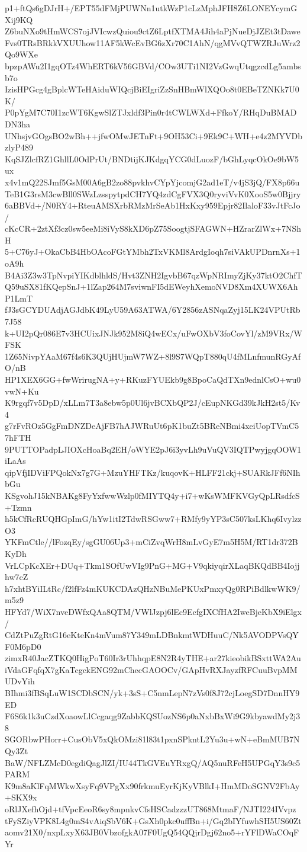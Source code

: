 p1+ftQs6gDJrH+/EPT55dFMjPUWNn1utkWzP1cLzMphJFH8Z6LONEYcymGXij9KQ
Z6buNXo9tHmWCS7ojJVIcwzQuiou9ctZ6LptfXTMA4Jih4aPjNueDjJZEt3tDawe
Fvs0TRsBRkkVXUUhow11AF5kWcEvBG6zXr70C1AhN/qgMVvQTWZRJuWrz2Qo9WXe
bpzpAWu2I1gqOTz4WhERT6kV56GBVd/COw3UTi1NI2VzGwqUtqgzcdLg5ambsb7o
IzisHPGcg4gBplcWTeHAiduWIQcjBiEIgriZzSnHBmWlXQOo8t0EBeTZNKk7U0K/
P0pYgM7C70I1zcWT6KgwSlZTJxldf3Pin0r4tCWLWXd+FfkoY/RHqDuBMADDN3ha
UNhsjvGOgsBO2wBh++jfwOMwJETnFt+9OH53Ci+9Ek9C+WH+e4z2MYVDbzlyP489
KqSJZlcfRZ1GhllL0OdPrUt/BNDtijKJKdgqYCG0dLuozF/bGhLyqcOkOe9bW5ux
x4v1mQ22SJmf5GsM00A6gB2zo88pvkhvCYpYjcomjG2ad1eT/v4jS3jQ/FX8p66u
TeB1G3rsM3cwBll0SWzLzsspytpdCH7YQ4zdCgFVX3Q0ryviVvK0XooS5w0Bjjry
6aBBVd+/N0RY4+RteuAMSXrbRMzMrSeAb1HxKxy959Epjr82IlaloF33vJtFcJo/
cKcCR+2ztXf3cz0sw5eeMi8iVyS8kXD6pZ75SoogtjSFAGWN+HZrarZlWx+7NShH
5+C76yJ+OkaCbB4HbOAcoFGtYMbh2TxVKMl8ArdgIoqh7siVAkUPDnrnXs+1oA9h
B4Ai3Z3w3TpNvpiYIKdblhldS/Hvt3ZNH2IgvbB67qzWpNRImyZjKy37ktO2ChfT
Q59uSX81fKQepSnJ+1lZap264M7sviwnFI5dEWeyhXemoNVD8Xm4XUWX6AhP1LmT
fJ3sGCYDUAdjAGJdbK49LyU59A63ATWA/6Y2856zASNqaZyj15LK24VPUtRb7J58
k+UI2pQr086E7v3HCUixJNJk952M8iQ4wECx/uFwOXbV3foCovYl/zM9VRx/WFSK
1Z65NivpYAaM67f4s6K3QUjHUjmW7WZ+8l9S7WQpT880qU4fMLnfmunRGyAfO/nB
HP1XEX6GG+fwWrirugNA+y+RKuzFYUEkb9g8BpoCaQdTXn9ednlCsO+wu0vwN+Ku
K9rgqf7v5DpD/xLLm7T3a8ebw5p0Ul6jvBCXbQP2J/cEupNKGd39kJkH2st5/Kv4
g7rFvROz5GgFmDNZDeAjFB7hAJWRuUt6pK1buZt5BReNBmi4xeiUopTVmC57hFTH
9PUTTOPadpLJIOXcHoaBq2EH/oWYE2pJ6i3yvLh9uVuQV3IQTPwyjgqOOW1iLaAs
qipVfjIDViFPQokNx7g7G+MzuYHFTKz/kuqovK+HLFF21ckj+SUARkJFf6NIhbGu
KSgvohJ15kNBAKg8FyYxfwwWzlp0fMIYTQ4y+i7+wKsWMFKVGyQpLRsdfcS+Tzmn
h5kCfRcRUQHGpImG/hYw1itI2TdwRSGww7+RMfy9yYP3sC507ksLKhq6IvylzzO3
YKFmCtle//lFozqEy/sgGU06Up3+mCiZvqWrH8mLvGyE7m5H5M/RT1dr372BKyDh
VrLCpKcXEr+DUq+Tkm1SOfUwVIg9PnG+MG+V9qkiyqirXLaqBKQdBB4Iojjhw7cZ
h7xhtBYiILtRc/f2lfFz4mKUKCDAzQHzNBuMePKUxPmxyQg0RPiBdlkwWK9/m5z9
HFYd7/WiX7nveDWfxQAa8QTM/VWlJzpj6lEc9EcfgIXCfHA2IweBjeKbX9iElgx/
CdZtPuZgRtG16eKteKn4mVum87Y349mLDBnkmtWDHuuC/Nk5AVODPVsQYF0M6pD0
zimxR40JacZTKQ0HigPoT60Ir3rUhhqpE8N2R4yTHE+ar27kieobikBSxttWA2Au
iVdaGFqfqX7gKaTcgckENG92mChecGAOOCv/GApHvRXJayzfRFCuuBvpMMUDvYih
BIhmi3fBSqLuW1SCDbSCN/yk+3sS+C5nmLepN7zVs0f8J72cjLoegSD7DnnHY9ED
F6S6k1k3uCzdXoaowLlCcgaqg9ZabbKQSUozNS6p0aNxbBxWi9G9kbyawdMy2j38
SGORbwPHorr+CusObV5xQkOMzi81l83t1pxnSPkntL2Yu3u+wN+eBmMUB7NQy3Zt
BaW/NFLZMcD0egdiQagJlZI/IU44TkGVEuYRxgQ/AQ5nuRFeH5UPGqY3s9c5PARM
K9m8aKlFqMWkwXsyFq9VPgXx90frkmuEyrKjKyVBlkI+HmMDoSGNV2FbAy+SKX9x
oRlJXefhOjd+tfVpcEeoR6sy8mpnkvCfsHSCadzzzUT868MtmaF/NJTI224IVvpz
tFySZiyVPK8L4g0mS4vAiqSbV6K+GsXh0pkc0uffBn+i/Gq2bIYfuwhSH5US60Zt
aomv21X0/nxpLxyX63JB0VbzofgkA07F0UgQ54QQjrDgj62no5+rYFlDWaCOqFYr
